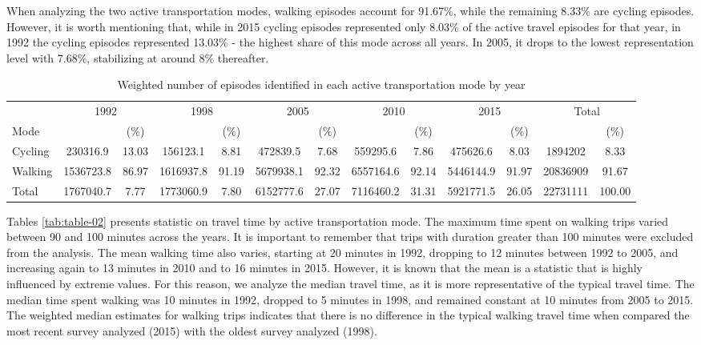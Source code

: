 \documentclass[preprint, 3p,
authoryear]{elsarticle} %
\begin{document}
When analyzing the two active transportation modes, walking episodes
account for 91.67\%, while the remaining 8.33\% are cycling episodes.
However, it is worth mentioning that, while in 2015 cycling episodes
represented only 8.03\% of the active travel episodes for that year, in
1992 the cycling episodes represented 13.03\% - the highest share of
this mode across all years. In 2005, it drops to the lowest
representation level with 7.68\%, stabilizing at around 8\% thereafter.

\begingroup\fontsize{8}{10}\selectfont

\begin{longtable}[t]{lcccccccccccc}
\caption{\label{tab:bulding table-01}\label{tab:episodes-count-percentages}Weighted number of episodes identified in each active transportation mode by year}\\
\toprule
\multicolumn{1}{c}{ } & \multicolumn{2}{c}{1992} & \multicolumn{2}{c}{1998} & \multicolumn{2}{c}{2005} & \multicolumn{2}{c}{2010} & \multicolumn{2}{c}{2015} & \multicolumn{2}{c}{Total} \\
\cmidrule(l{3pt}r{3pt}){2-3} \cmidrule(l{3pt}r{3pt}){4-5} \cmidrule(l{3pt}r{3pt}){6-7} \cmidrule(l{3pt}r{3pt}){8-9} \cmidrule(l{3pt}r{3pt}){10-11} \cmidrule(l{3pt}r{3pt}){12-13}
Mode &  & (\%) &  & (\%) &  & (\%) &  & (\%) &  & (\%) &  & (\%)\\
\midrule
Cycling & 230316.9 & 13.03 & 156123.1 & 8.81 & 472839.5 & 7.68 & 559295.6 & 7.86 & 475626.6 & 8.03 & 1894202 & 8.33\\
Walking & 1536723.8 & 86.97 & 1616937.8 & 91.19 & 5679938.1 & 92.32 & 6557164.6 & 92.14 & 5446144.9 & 91.97 & 20836909 & 91.67\\
Total & 1767040.7 & 7.77 & 1773060.9 & 7.80 & 6152777.6 & 27.07 & 7116460.2 & 31.31 & 5921771.5 & 26.05 & 22731111 & 100.00\\
\bottomrule
\end{longtable}
\endgroup{}

Tables \ref{tab:table-02} presents statistic on travel time by active
transportation mode. The maximum time spent on walking trips varied
between 90 and 100 minutes across the years. It is important to remember
that trips with duration greater than 100 minutes were excluded from the
analysis. The mean walking time also varies, starting at 20 minutes in
1992, dropping to 12 minutes between 1992 to 2005, and increasing again
to 13 minutes in 2010 and to 16 minutes in 2015. However, it is known
that the mean is a statistic that is highly influenced by extreme
values. For this reason, we analyze the median travel time, as it is
more representative of the typical travel time. The median time spent
walking was 10 minutes in 1992, dropped to 5 minutes in 1998, and
remained constant at 10 minutes from 2005 to 2015. The weighted median
estimates for walking trips indicates that there is no difference in the
typical walking travel time when compared the most recent survey
analyzed (2015) with the oldest survey analyzed (1998).
\end{document}
